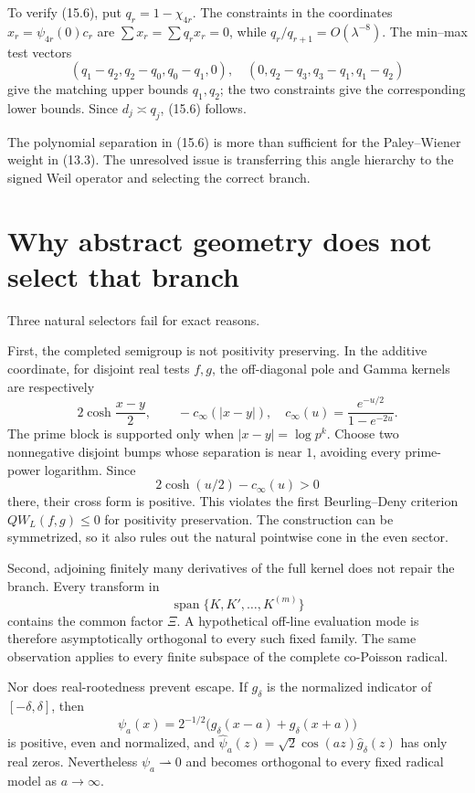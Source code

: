 \documentclass[11pt]{amsart}
\theoremstyle{definition}
\theoremstyle{remark}
\newcommand{\XiR}{\Xi}
\begin{document}
To verify (15.6), put \(q_r=1-\chi_{4r}\).  The constraints in the
coordinates \(x_r=\psi_{4r}(0)c_r\) are
\(\sum x_r=\sum q_rx_r=0\), while
\(q_r/q_{r+1}=O(\lambda^{-8})\).  The min--max test vectors
\[
 (q_1-q_2,q_2-q_0,q_0-q_1,0),
 \quad
 (0,q_2-q_3,q_3-q_1,q_1-q_2)
\]
give the matching upper bounds \(q_1,q_2\); the two constraints give the
corresponding lower bounds.  Since \(d_j\asymp q_j\), (15.6) follows.

The polynomial separation in (15.6) is more than sufficient for the
Paley--Wiener weight in (13.3).  The unresolved issue is transferring this
angle hierarchy to the signed Weil operator and selecting the correct
branch.

\section{Why abstract geometry does not select that branch}
\label{sec:nogos}

Three natural selectors fail for exact reasons.

First, the completed semigroup is not positivity preserving.  In the
additive coordinate, for disjoint real tests \(f,g\), the off-diagonal pole
and Gamma kernels are respectively
\[
 2\cosh\frac{x-y}{2},
 \qquad
 -c_\infty(|x-y|),
 \quad
 c_\infty(u)=\frac{e^{-u/2}}{1-e^{-2u}}.
\]
The prime block is supported only when \(|x-y|=\log p^k\).  Choose two
nonnegative disjoint bumps whose separation is near \(1\), avoiding every
prime-power logarithm.  Since
\[
 2\cosh(u/2)-c_\infty(u)>0
\]
there, their cross form is positive.  This violates the first
Beurling--Deny criterion \(QW_L(f,g)\le0\) for positivity preservation.
The construction can be symmetrized, so it also rules out the natural
pointwise cone in the even sector.

Second, adjoining finitely many derivatives of the full kernel does not
repair the branch.  Every transform in
\[
 \operatorname{span}\{K,K',\ldots,K^{(m)}\}
\]
contains the common factor \(\XiR\).  A hypothetical off-line evaluation
mode is therefore asymptotically orthogonal to every such fixed family.
The same observation applies to every finite subspace of the complete
co-Poisson radical.

Nor does real-rootedness prevent escape.  If \(g_\delta\) is the normalized
indicator of \([-\delta,\delta]\), then
\[
 \psi_a(x)=2^{-1/2}\bigl(g_\delta(x-a)+g_\delta(x+a)\bigr)
\]
is positive, even and normalized, and
\(\widehat\psi_a(z)=\sqrt2\cos(az)\widehat g_\delta(z)\) has only real
zeros.  Nevertheless \(\psi_a\rightharpoonup0\) and becomes orthogonal to
every fixed radical model as \(a\to\infty\).
\end{document}
